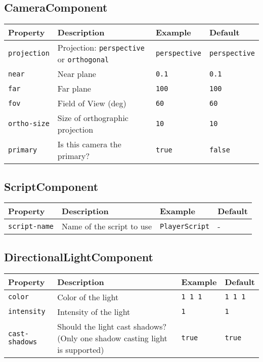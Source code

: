 \subsection{CameraComponent}
\label{comp:CameraComponent}
\begin{tabular}{|l|l|l|l|}
    \hline
    Property & Description & Example & Default \\ \hline
    \verb|projection| & Projection: \verb|perspective| or \verb|orthogonal| & \verb|perspective| & \verb|perspective| \\ \hline
    \verb|near| & Near plane & \verb|0.1| & \verb|0.1| \\ \hline
    \verb|far| & Far plane & \verb|100| & \verb|100| \\ \hline
    \verb|fov| & Field of View (deg) & \verb|60| & \verb|60| \\ \hline
    \verb|ortho-size| & Size of orthographic projection & \verb|10| & \verb|10| \\ \hline
    \verb|primary| & Is this camera the primary? & \verb|true| & \verb|false| \\ \hline
\end{tabular}

\subsection{ScriptComponent}
\label{comp:ScriptComponent}
\begin{tabular}{|l|l|l|l|}
    \hline
    Property & Description & Example & Default \\ \hline
    \verb|script-name| & Name of the script to use & \verb|PlayerScript| & - \\ \hline
\end{tabular}

\subsection{DirectionalLightComponent}
\label{comp:DirectionalLightComponent}
\begin{tabular}{|l|l|l|l|}
    \hline
    Property & Description & Example & Default \\ \hline
    \verb|color| & Color of the light & \verb|1 1 1| & \verb|1 1 1| \\ \hline
    \verb|intensity| & Intensity of the light & \verb|1| & \verb|1| \\ \hline
    \verb|cast-shadows| & Should the light cast shadows? (Only one shadow casting light is supported) & \verb|true| & \verb|true| \\ \hline
\end{tabular}

